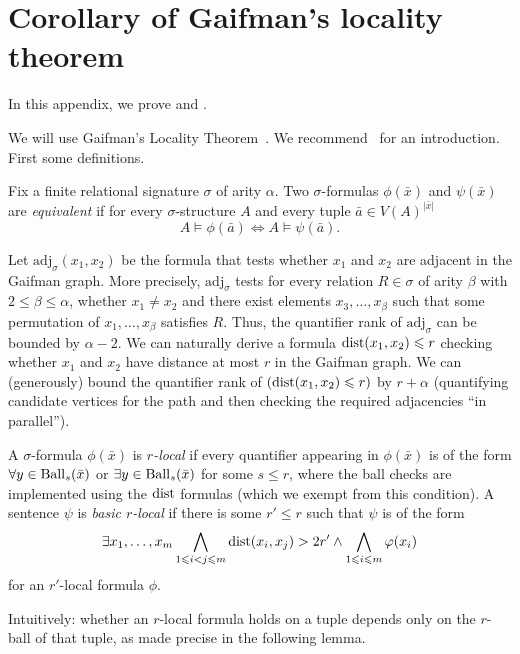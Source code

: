 \section{Corollary of Gaifman's locality theorem}\label{app:gaifman}
In this appendix, we prove  and .

\newcommand{\adj}{\mathrm{adj}}

We will use Gaifman's Locality Theorem~\cite{gaifman}.
We recommend~\cite[Section~4.1]{logic-graphs-algorithms} for an introduction.
First some definitions.


Fix a finite relational signature $\sigma$ of arity $\alpha$.
Two $\sigma$-formulas $\phi(\bar x)$ and $\psi(\bar x)$ are \emph{equivalent} if for every $\sigma$-structure $A$ and every tuple $\bar a \in V(A)^{|\bar x|}$
    \[
    A\models \phi(\bar a) \Leftrightarrow A \models \psi(\bar a).
    \]

Let $\adj_\sigma(x_1,x_2)$ be the formula that tests whether $x_1$ and $x_2$ are adjacent in the Gaifman graph.
More precisely, $\adj_\sigma$ tests for every  relation $R \in \sigma$ of arity $\beta$ with $2\le\beta \leq \alpha$, whether $x_1\neq x_2$ and there exist elements $x_3, \ldots, x_\beta$ such that some permutation of $x_1, \ldots, x_\beta$ satisfies $R$.
Thus, the quantifier rank of $\adj_\sigma$ can be bounded by $\alpha - 2$.
We can naturally derive a formula $\mathrm{dist}(x_1,x_2) \leqslant r$ checking whether $x_1$ and $x_2$ have distance at most $r$ in the Gaifman graph.
We can (generously) bound the quantifier rank of $(\mathrm{dist}(x_1,x_2) \leqslant r)$ by $r + \alpha$ (quantifying candidate vertices for the path and then checking the required adjacencies ``in parallel'').

A $\sigma$-formula $\phi(\bar x)$ is \emph{$r$-local}
if every quantifier appearing in $\phi(\bar x)$ is of the form \mbox{$\forall y \in \operatorname{Ball}_s(\bar x)$} or $\exists y \in \operatorname{Ball}_s(\bar x)$ for some $s \leq r$, where the ball checks are implemented using the $\mathrm{dist}$ formulas (which we exempt from this condition).
A sentence $\psi$ is \emph{basic $r$-local} if there is some $r' \leq r$ such that $\psi$ is of the form
\[
  \exists x_1, \ldots, x_m \bigwedge_{1 \leqslant i < j \leqslant m} \mathrm{dist}(x_i,x_j) > 2r'
  \wedge
  \bigwedge_{1 \leqslant i \leqslant m} \varphi(x_i)
\]
for an $r'$-local formula $\phi$.

Intuitively: whether an $r$-local formula holds on a tuple depends only on the $r$-ball of that tuple, as made precise in the following lemma.

